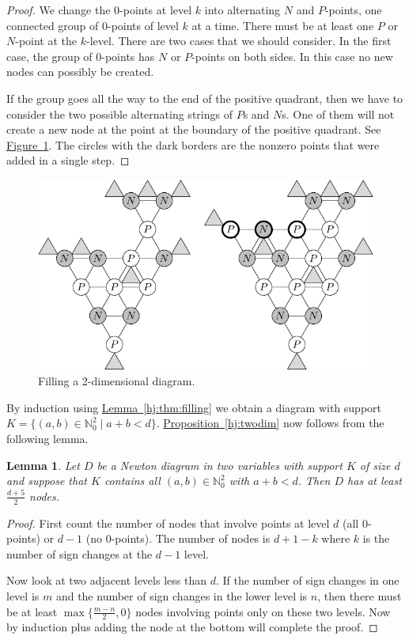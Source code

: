 \documentclass[12pt,openany]{book}
\newcommand{\N}{{\mathbb{N}}}
\theoremstyle{plain}
\newtheorem{lemma}[thm]{Lemma}
\theoremstyle{remark}
\theoremstyle{definition}
\theoremstyle{exercise}
\theoremstyle{example}
\newcommand{\figureref}[1]{\hyperref[#1]{Figure~\ref*{#1}}}
\newcommand{\propref}[1]{\hyperref[#1]{Proposition~\ref*{#1}}}
\newcommand{\lemmaref}[1]{\hyperref[#1]{Lemma~\ref*{#1}}}
\begin{document}
\begin{proof}
We change the $0$-points at level $k$ into alternating $N$ and $P$-points, one
connected group of $0$-points of level $k$ at a time.
There must be at least one
$P$ or $N$-point at the $k$-level.  There are two cases that we should
consider.  In the first case, the group of $0$-points has $N$ or $P$-points on
both sides.  In this case no new nodes can possibly be created.

If the group goes all the way to the end of the positive quadrant, then
we have to consider the two possible alternating strings of $P$s and $N$s.
One of them will not create a new node at the point at the boundary of
the positive quadrant.
See \figureref{fig:filling}.  The circles with the dark borders
are the nonzero points that were added in a single step.
\end{proof}

\begin{figure}[h!t]
\begin{center}
\includegraphics{diag8}
\caption{Filling a 2-dimensional diagram.\label{fig:filling}}
\end{center}
\end{figure}

By induction using
\lemmaref{hj:thm:filling} we obtain a diagram with
support
$K = \{(a,b) \in \N_0^2 \mid a+b < d\}$.
\propref{hj:twodim} now follows from the following lemma.

\begin{lemma}\label{dkr-lemma}
Let $D$ be a Newton diagram in two variables with support $K$ of size $d$
and suppose that $K$ 
contains all $(a,b) \in \N_0^2$
with $a+b < d$. Then $D$ has at least
$\frac{d+5}{2}$ nodes.
\end{lemma}

\begin{proof}
First count the number of nodes
that involve points at level $d$ (all $0$-points) or $d-1$
(no $0$-points).  The number of nodes is $d+1-k$ where $k$
is the number of sign changes at the $d-1$ level. 

Now look at two adjacent levels less than $d$.  If the number of
sign changes in one level is $m$ and the number of sign changes in
the lower level is $n$, then there
must be at least 
$\max\{ \frac{m-n}{2} , 0 \}$ nodes involving points only on these two levels.
Now by induction plus adding the node at the bottom will complete the proof.
\end{proof}
\end{document}
